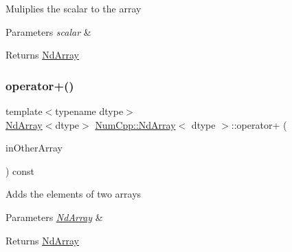Muliplies the scalar to the array


\begin{DoxyParams}{Parameters}
{\em scalar} & \\
\hline
\end{DoxyParams}
\begin{DoxyReturn}{Returns}
\mbox{\hyperlink{class_num_cpp_1_1_nd_array}{Nd\+Array}} 
\end{DoxyReturn}
\mbox{\label{class_num_cpp_1_1_nd_array_abedae68ef9da54acff245f2546f2dab5}} 
\subsubsection{\texorpdfstring{operator+()}{operator+()}\hspace{0.1cm}{\footnotesize\ttfamily [1/2]}}
{\footnotesize\ttfamily template$<$typename dtype$>$ \\
\mbox{\hyperlink{class_num_cpp_1_1_nd_array}{Nd\+Array}}$<$dtype$>$ \mbox{\hyperlink{class_num_cpp_1_1_nd_array}{Num\+Cpp\+::\+Nd\+Array}}$<$ dtype $>$\+::operator+ (\begin{DoxyParamCaption}\item[{const \mbox{\hyperlink{class_num_cpp_1_1_nd_array}{Nd\+Array}}$<$ dtype $>$ \&}]{in\+Other\+Array }\end{DoxyParamCaption}) const\hspace{0.3cm}{\ttfamily [inline]}}

Adds the elements of two arrays


\begin{DoxyParams}{Parameters}
{\em \mbox{\hyperlink{class_num_cpp_1_1_nd_array}{Nd\+Array}}} & \\
\hline
\end{DoxyParams}
\begin{DoxyReturn}{Returns}
\mbox{\hyperlink{class_num_cpp_1_1_nd_array}{Nd\+Array}} 
\end{DoxyReturn}
\mbox{\label{class_num_cpp_1_1_nd_array_a17a982e38f88112fa5139675bc3f8d6e}} 
